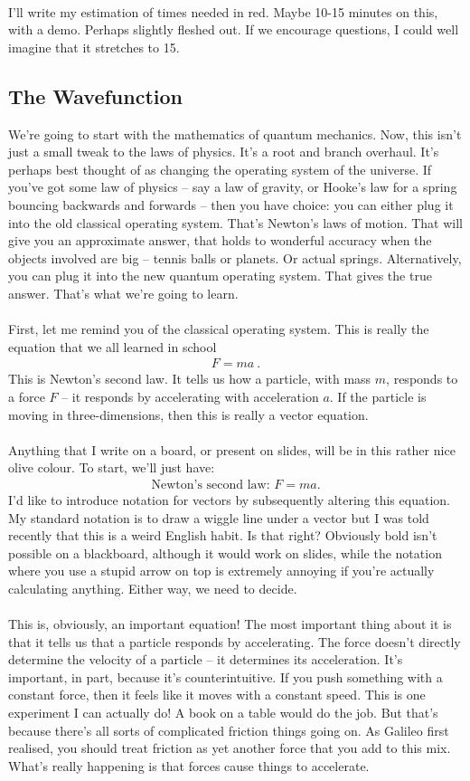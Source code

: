 \documentclass[12pt]{article}
\def\be{\begin{eqnarray}}
\def\ee{\end{eqnarray}}
\newcommand{\nn}{\nonumber}
\newcommand\para{\paragraph{}}
\begin{document}
\para
{\color{red} I'll write my estimation of times needed  in red. Maybe 10-15 minutes on this, with a demo. Perhaps slightly fleshed out. If we encourage questions, I could well imagine that it stretches to 15.}

\subsection{The Wavefunction}

We're going to start with the mathematics of quantum mechanics. Now, this isn't just a small tweak to the laws of physics. It's a root and branch overhaul. It's perhaps best thought of as changing the operating system of the universe. If you've got some law of physics -- say a law of gravity, or Hooke's law for a spring bouncing backwards and forwards -- then you have choice: you can either plug it into the old classical operating system. That's Newton's laws of motion. That will give you an approximate answer, that holds to wonderful accuracy when the objects involved are big -- tennis balls or planets. Or actual springs. Alternatively, you can plug it into the new quantum operating system. That gives the true answer. That's what we're going to learn.

\para
First, let me remind you of the classical operating system. This is really the equation that we all learned in school
%
\be F=ma\ .\nn\ee
%
This is Newton's second law. It tells us how a particle, with mass $m$, responds to a force $F$ -- it responds by accelerating with acceleration $a$. If the particle is moving in three-dimensions, then this is really a vector equation.

\para
{\color{olive} Anything that I write on a board, or present on slides, will be in this rather nice olive colour. To start, we'll just have:
\be  \mbox{Newton's second law: $F=ma$.}\nn\ee}
%
{\color{blue}I'd like to introduce notation for vectors by subsequently altering this equation. My standard notation is to draw a wiggle line under a vector but I was told recently that this is a weird English habit. Is that right? Obviously bold isn't possible on a blackboard, although it would work on slides, while the notation where you use a stupid arrow on top is extremely annoying if you're actually calculating anything. Either way, we need to decide.}

\para
This is, obviously, an important equation! The most important thing about it is that it tells us that a particle responds by accelerating. The force doesn't directly determine the velocity of a particle -- it determines its acceleration. It's important, in part, because it's counterintuitive. If you push something with a constant force, then it feels like it moves with a constant speed. {\color{blue}This is one experiment I can actually do! A book on a table would do the job.} But that's because there's all sorts of complicated friction things going on. As Galileo first realised, you should treat friction as yet another force that you add to this mix. What's really happening is that forces cause things to accelerate.
\end{document}
